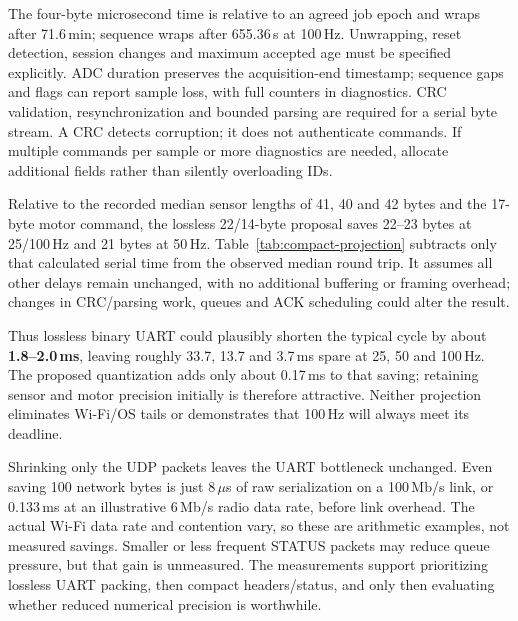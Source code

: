 The four-byte microsecond time is relative to an agreed job epoch and wraps after 71.6\,min; sequence wraps after 655.36\,s at 100\,Hz. Unwrapping, reset detection, session changes and maximum accepted age must be specified explicitly. ADC duration preserves the acquisition-end timestamp; sequence gaps and flags can report sample loss, with full counters in diagnostics. CRC validation, resynchronization and bounded parsing are required for a serial byte stream. A CRC detects corruption; it does not authenticate commands. If multiple commands per sample or more diagnostics are needed, allocate additional fields rather than silently overloading IDs.

Relative to the recorded median sensor lengths of 41, 40 and 42 bytes and the 17-byte motor command, the lossless 22/14-byte proposal saves 22--23 bytes at 25/100\,Hz and 21 bytes at 50\,Hz. Table~\ref{tab:compact-projection} subtracts only that calculated serial time from the observed median round trip. It assumes all other delays remain unchanged, with no additional buffering or framing overhead; changes in CRC/parsing work, queues and ACK scheduling could alter the result.

\begin{table}[H]
\centering\small
\caption{Speculative binary-UART projection, not new measurements. Rate is Hz; times are ms. Bytes saved are per sensor-plus-command pair. The last column additionally drops three ADC LSBs and uses six-bit motor magnitudes, saving two further bytes (0.174\,ms per cycle).}
\label{tab:compact-projection}

\end{table}

Thus lossless binary UART could plausibly shorten the typical cycle by about \textbf{1.8--2.0\,ms}, leaving roughly 33.7, 13.7 and 3.7\,ms spare at 25, 50 and 100\,Hz. The proposed quantization adds only about 0.17\,ms to that saving; retaining sensor and motor precision initially is therefore attractive. Neither projection eliminates Wi-Fi/OS tails or demonstrates that 100\,Hz will always meet its deadline.

Shrinking only the UDP packets leaves the UART bottleneck unchanged. Even saving 100 network bytes is just 8\,$\mu$s of raw serialization on a 100\,Mb/s link, or 0.133\,ms at an illustrative 6\,Mb/s radio data rate, before link overhead. The actual Wi-Fi data rate and contention vary, so these are arithmetic examples, not measured savings. Smaller or less frequent STATUS packets may reduce queue pressure, but that gain is unmeasured. The measurements support prioritizing lossless UART packing, then compact headers/status, and only then evaluating whether reduced numerical precision is worthwhile.

